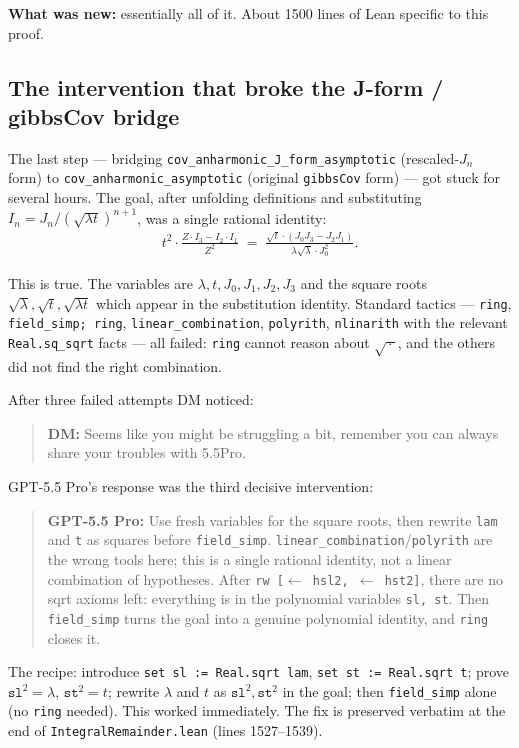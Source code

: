 \documentclass[11pt]{article}
\newcommand{\userbox}[1]{\par\medskip\begin{quote}\small\textbf{\textcolor{blue!60}{DM:}} #1\end{quote}\medskip}
\newcommand{\gptbox}[1]{\par\medskip\begin{quote}\small\textbf{\textcolor{green!50!black}{GPT-5.5 Pro:}} #1\end{quote}\medskip}
\begin{document}
\textbf{What was new:} essentially all of it. About 1500 lines of Lean
specific to this proof.

\subsection{The intervention that broke the J-form / gibbsCov bridge}\label{sec:bridge}

The last step --- bridging
\texttt{cov\_anharmonic\_J\_form\_asymptotic} (rescaled-$J_n$ form) to
\texttt{cov\_anharmonic\_asymptotic} (original \texttt{gibbsCov} form)
--- got stuck for several hours. The goal, after unfolding definitions
and substituting $I_n = J_n / (\sqrt{\lambda t})^{n+1}$, was a single
rational identity:
\begin{multline*}
  t^2 \cdot \frac{Z\cdot I_3 - I_2\cdot I_1}{Z^2}
  \;=\; \frac{\sqrt t \cdot (J_0 J_3 - J_2 J_1)}{\lambda\sqrt\lambda \cdot J_0^2}.
\end{multline*}

This is true. The variables are $\lambda, t, J_0, J_1, J_2, J_3$ and the
square roots $\sqrt\lambda, \sqrt t, \sqrt{\lambda t}$ which appear in
the substitution identity. Standard tactics --- \texttt{ring},
\texttt{field\_simp; ring}, \texttt{linear\_combination},
\texttt{polyrith}, \texttt{nlinarith} with the relevant
\texttt{Real.sq\_sqrt} facts --- all failed: \texttt{ring} cannot reason
about $\sqrt{\,\cdot\,}$, and the others did not find the right
combination.

After three failed attempts DM noticed:

\userbox{Seems like you might be struggling a bit, remember you can always
share your troubles with 5.5Pro.}

GPT-5.5 Pro's response was the third decisive intervention:

\gptbox{Use fresh variables for the square roots, then rewrite \texttt{lam}
and \texttt{t} as squares before \texttt{field\_simp}.
\texttt{linear\_combination}/\texttt{polyrith} are the wrong tools here;
this is a single rational identity, not a linear combination of
hypotheses. After \texttt{rw [$\leftarrow$\,hsl2, $\leftarrow$\,hst2]},
there are no sqrt axioms left: everything is in the polynomial variables
\texttt{sl, st}. Then \texttt{field\_simp} turns the goal into a genuine
polynomial identity, and \texttt{ring} closes it.}

The recipe: introduce \texttt{set sl := Real.sqrt lam},
\texttt{set st := Real.sqrt t}; prove $\texttt{sl}^2 = \lambda$,
$\texttt{st}^2 = t$; rewrite $\lambda$ and $t$ as $\texttt{sl}^2,
\texttt{st}^2$ in the goal; then \texttt{field\_simp} alone (no
\texttt{ring} needed). This worked immediately. The fix is preserved
verbatim at the end of \texttt{IntegralRemainder.lean} (lines
1527--1539).
\end{document}

